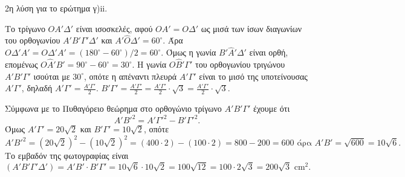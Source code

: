 2η λύση για το ερώτημα γ)ii.

Το τρίγωνο $OA'\Delta'$ είναι ισοσκελές, αφού $OA' = O\Delta'$ ως μισά των ίσων διαγωνίων του ορθογωνίου $A'B'\Gamma'\Delta'$ και $A'\widehat{O}\Delta' = 60^\circ$. Άρα $O\Delta'A' = O\Delta'A' = (180^\circ - 60^\circ)/2 = 60^\circ$. Όμως η γωνία $B'\widehat{A}'\Delta'$ είναι ορθή, επομένως $O\widehat{A}'B' = 90^\circ - 60^\circ = 30^\circ$.
Η γωνία $O\widehat{B}'\Gamma'$ του ορθογωνίου τριγώνου $A'B'\Gamma'$ ισούται με $30^\circ$, οπότε η απέναντι πλευρά $A'\Gamma'$ είναι το μισό της υποτείνουσας $A'\Gamma'$, δηλαδή $A'\Gamma' = \frac{A'\Gamma'}{2}$.
$B'\Gamma' = \frac{A'\Gamma'}{2} = \frac{A'\Gamma'}{2} \cdot \sqrt{3} = \frac{A'\Gamma'}{2} \cdot \sqrt{3}$.

Σύμφωνα με το Πυθαγόρειο θεώρημα στο ορθογώνιο τρίγωνο $A'B'\Gamma'$ έχουμε ότι
\[ A'B'^2 = A'\Gamma'^2 - B'\Gamma'^2. \]
Όμως $A'\Gamma' = 20\sqrt{2}$ και $B'\Gamma' = 10\sqrt{2}$, οπότε
\[ A'B'^2 = (20\sqrt{2})^2 - (10\sqrt{2})^2 = (400 \cdot 2) - (100 \cdot 2) = 800 - 200 = 600 \text{ άρα } A'B' = \sqrt{600} = 10\sqrt{6}. \]
Το εμβαδόν της φωτογραφίας είναι
\[ (A'B'\Gamma'\Delta') = A'B' \cdot B'\Gamma' = 10\sqrt{6} \cdot 10\sqrt{2} = 100\sqrt{12} = 100 \cdot 2\sqrt{3} = 200\sqrt{3} \text{ cm}^2. \]